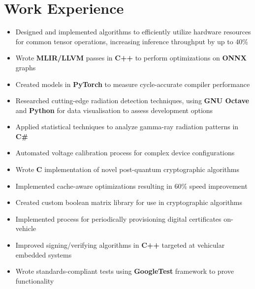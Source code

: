 \documentclass{moderncv}
\begin{document}
\makecvtitle
\section{Work Experience}
{\begin{itemize}
    \item Designed and implemented algorithms to efficiently utilize hardware resources for common tensor operations, increasing inference throughput by up to 40\%
    \item Wrote \textbf{MLIR/LLVM} passes in \textbf{C++} to perform optimizations on \textbf{ONNX} graphs
    \item Created models in \textbf{PyTorch} to measure cycle-accurate compiler performance
\end{itemize}}

{\begin{itemize}
    \item Researched cutting-edge radiation detection techniques, using \textbf{GNU Octave} and \textbf{Python} for data visualisation to assess development options
    \item Applied statistical techniques to analyze gamma-ray radiation patterns in \textbf{C\#}
    \item Automated voltage calibration process for complex device configurations
\end{itemize}}

{\begin{itemize}
    \item Wrote \textbf{C} implementation of novel post-quantum cryptographic algorithms
    \item Implemented cache-aware optimizations resulting in 60\% speed improvement
    \item Created custom boolean matrix library for use in cryptographic algorithms
\end{itemize}}

{\begin{itemize}
    \item Implemented process for periodically provisioning digital certificates on-vehicle
    \item Improved signing/verifying algorithms in \textbf{C++} targeted at vehicular embedded systems
    \item Wrote standards-compliant tests using \textbf{GoogleTest} framework to prove functionality
\end{itemize}}
\end{document}
